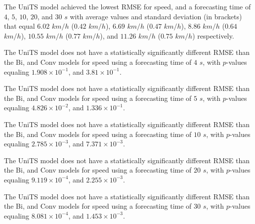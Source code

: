 The UniTS model achieved the lowest RMSE for speed, and a forecasting time of $4$, $5$, $10$, $20$, and $30$ $s$ with average values and standard deviation (in brackets) that equal $6.02$ $km/h$ ($0.42$ $km/h$), $6.69$ $km/h$ ($0.47$ $km/h$), $8.86$ $km/h$ ($0.64$ $km/h$), $10.55$ $km/h$ ($0.77$ $km/h$), and $11.26$ $km/h$ ($0.75$ $km/h$) respectively.

The UniTS model does not have a statistically significantly different RMSE than the Bi, and Conv models for speed using a forecasting time of $4$ $s$, with $p$-values equaling $1.908 \times 10^{-1}$, and $3.81 \times 10^{-1}$.

The UniTS model does not have a statistically significantly different RMSE than the Bi, and Conv models for speed using a forecasting time of $5$ $s$, with $p$-values equaling $4.826 \times 10^{-2}$, and $1.336 \times 10^{-1}$.

The UniTS model does not have a statistically significantly different RMSE than the Bi, and Conv models for speed using a forecasting time of $10$ $s$, with $p$-values equaling $2.785 \times 10^{-3}$, and $7.371 \times 10^{-3}$.

The UniTS model does not have a statistically significantly different RMSE than the Bi, and Conv models for speed using a forecasting time of $20$ $s$, with $p$-values equaling $9.119 \times 10^{-4}$, and $2.255 \times 10^{-3}$.

The UniTS model does not have a statistically significantly different RMSE than the Bi, and Conv models for speed using a forecasting time of $30$ $s$, with $p$-values equaling $8.081 \times 10^{-4}$, and $1.453 \times 10^{-3}$.

